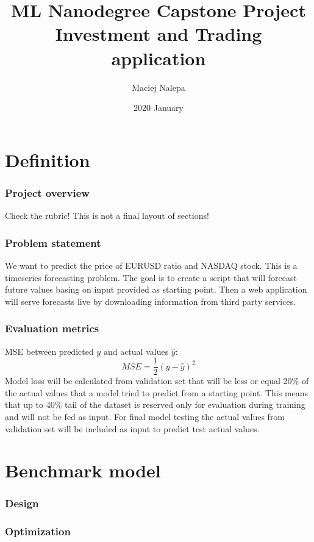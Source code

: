 \documentclass[a4paper,12pt]{article}
\title{ML Nanodegree Capstone Project\\Investment and Trading application}
\author{Maciej Nalepa}
\date{2020 January}
\begin{document}
\maketitle

\part{Definition}
\section*{Project overview}
Check the rubric! This is not a final layout of sections!

\section*{Problem statement}
We want to predict the price of EURUSD ratio and NASDAQ stock. This is a timeseries forecasting problem. The goal is to create a script that will forecast future values basing on input provided as starting point. Then a web application will serve forecasts live by downloading information from third party services.

\section*{Evaluation metrics}
MSE between predicted $y$ and actual values $\hat{y}$:
\begin{equation}
	MSE = \frac{1}{2} \left( y - \hat{y} \right)^2
\end{equation}
Model loss will be calculated from validation set that will be less or equal 20\% of the actual values that a model tried to predict from a starting point. This means that up to 40\% tail of the dataset is reserved only for evaluation during training and will not be fed as input. For final model testing the actual values from validation set will be included as input to predict test actual values.


\part{Benchmark model}
\section{Design}
\section{Optimization}
\end{document}
